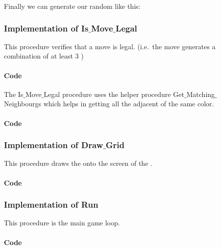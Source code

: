 \noindent
Finally we can generate our random \sqs like this:




\newpage

\subsubsection{Implementation of Is$\_$Move$\_$Legal}

This procedure verifies that a move is legal. (i.e.\  the move generates a combination of at least 3 \sqs)

\paragraph{Code}
\noindent
\begin{centering}

\end{centering}
\newpage

The Is$\_$Move$\_$Legal procedure uses the helper procedure Get$\_$Matching$\_$Neighbourgs which helps in getting all the adjacent \sqs of the same color.

\paragraph{Code}
\noindent
\begin{centering}

\end{centering}
\newpage

\subsubsection{Implementation of Draw$\_$Grid}

This procedure draws the \grid onto the screen of the \stmdb.

\paragraph{Code}
\noindent
\begin{centering}

\end{centering}
\newpage

\subsubsection{Implementation of Run}

This procedure is the main game loop.

\paragraph{Code}
\begin{centering}

\end{centering}
\newpage

